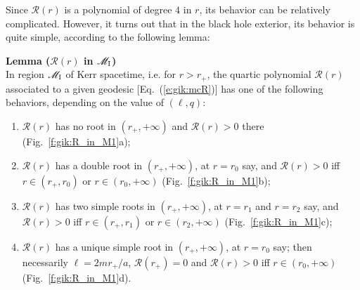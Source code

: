 Since $\mathcal{R}(r)$ is a polynomial of degree $4$ in $r$, its
behavior can be relatively complicated. However, it turns out that in the
black hole exterior, its behavior is quite simple, according to the
following lemma:
\begin{greybox}
\textbf{Lemma ($\mathcal{R}(r)$ in $\mathscr{M}_{\rm I}$)}\\[1ex]
In region $\mathscr{M}_{\rm I}$ of Kerr spacetime, i.e. for $r> r_+$, the
quartic polynomial $\mathcal{R}(r)$ associated to a given geodesic
[Eq.~(\ref{e:gik:mcR})] has one of the following behaviors, depending
on the value of $(\ell, q)$:
\begin{enumerate}
\item $\mathcal{R}(r)$ has no root in $(r_+,+\infty)$ and $\mathcal{R}(r) > 0$
there (Fig.~\ref{f:gik:R_in_M1}a);
\item $\mathcal{R}(r)$ has a double root in $(r_+,+\infty)$, at $r=r_0$ say, and
$\mathcal{R}(r) > 0$ iff $r\in(r_+, r_0)$ or $r\in(r_0, +\infty)$
(Fig.~\ref{f:gik:R_in_M1}b);
\item $\mathcal{R}(r)$ has two simple roots in $(r_+,+\infty)$, at $r=r_1$ and $r=r_2$ say, and
$\mathcal{R}(r) > 0$ iff $r\in(r_+, r_1)$ or $r\in(r_2, +\infty)$
(Fig.~\ref{f:gik:R_in_M1}c);
\item $\mathcal{R}(r)$ has a unique simple root in $(r_+,+\infty)$, at $r=r_0$ say; then
necessarily $\ell = 2 m r_+ /a$, $\mathcal{R}(r_+) = 0$ and
$\mathcal{R}(r) > 0$ iff $r\in(r_0, +\infty)$
(Fig.~\ref{f:gik:R_in_M1}d).
\end{enumerate}
\end{greybox}
